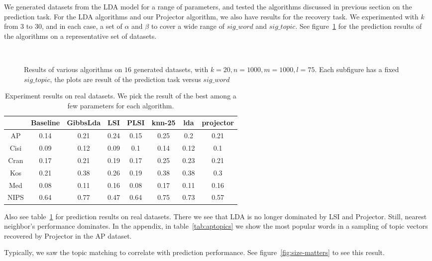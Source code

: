We generated datasets from the LDA model for a range of parameters,
and tested the algorithms discussed in previous section on the
prediction task. For the LDA algorithms and our Projector algorithm, we
also have results for the recovery task. We experimented with $k$ from
$3$ to $30$, and in each case, a set of $\alpha$ and $\beta$ to cover
a wide range of $sig\_word$ and $sig\_topic$. See
figure~\ref{fig:predictResult} for the prediction results of the
algorithms on a representative set of datasets.
\begin{figure}[ht]
     \begin{center}

        \\ 

    \end{center}
    \caption{Results of various algorithms on $16$ generated datasets, with $k=20, n=1000,m=1000,l=75$. Each subfigure has a fixed $sig\_topic$, the plots are result of the prediction task versus $sig\_word$}
   \label{fig:predictResult}
\end{figure}

\begin{table}[ht]
\begin{tabular}{|c|c|c|c|c|c|c|c|}
\hline 
 &Baseline &GibbsLda &LSI &PLSI &knn-25 &lda &projector \\
 \hline 
AP &0.14 &0.21 &0.24 &0.15 &0.25 &0.2 &0.21 \\
 \hline 
Cisi &0.09 &0.12 &0.09 &0.1 &0.14 &0.12 &0.1 \\
 \hline 
Cran &0.17 &0.21 &0.19 &0.17 &0.25 &0.23 &0.21 \\
 \hline 
Kos &0.21 &0.38 &0.26 &0.19 &0.38 &0.38 &0.3 \\
 \hline 
Med &0.08 &0.11 &0.16 &0.08 &0.17 &0.11 &0.16 \\
 \hline 
NIPS &0.64 &0.77 &0.47 &0.64 &0.75 &0.73 &0.57 \\
 \hline 

\end{tabular}
\caption{Experiment results on real datasets. We pick the result of the best among a few parameters for each algorithm. }
\label{tab:real}
\end{table}


Also see table~\ref{tab:real} for prediction results on real datasets.  There we see that
LDA is no longer dominated by LSI and Projector.  Still,  nearest neighbor's performance
dominates.  In the appendix, in table~\ref{tab:aptopics} we show the most popular
words in a sampling of topic vectors recovered by Projector in the AP dataset.

Typically, we saw the topic matching to correlate with prediction performance.
See figure~\ref{fig:size-matters} to see this result. 
